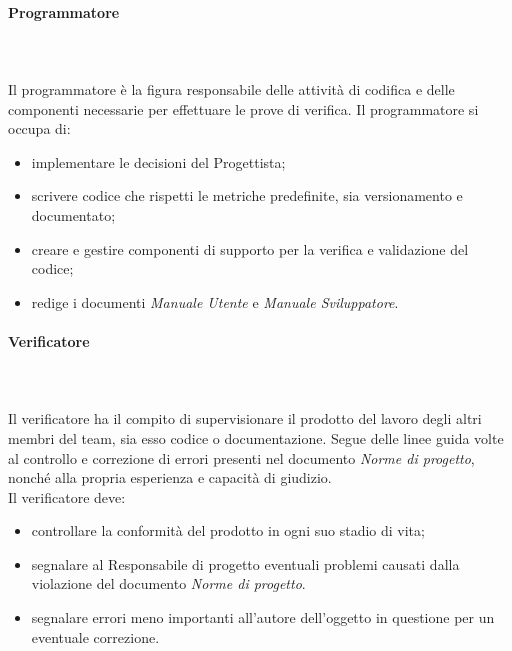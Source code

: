 			\paragraph{Programmatore} \mbox{}\\ \mbox{}\\
			Il programmatore è la figura responsabile delle attività di codifica e delle componenti necessarie per effettuare le prove di verifica.
			Il programmatore si occupa di:
			\begin{itemize}
				\item implementare le decisioni del Progettista;
				\item scrivere codice che rispetti le metriche predefinite, sia versionamento e documentato;
				\item creare e gestire componenti di supporto per la verifica e validazione del codice;
				\item redige i documenti \textit{Manuale Utente} e \textit{Manuale Sviluppatore}.
			\end{itemize}
			\paragraph{Verificatore} \mbox{}\\ \mbox{}\\
			Il verificatore ha il compito di supervisionare il prodotto del lavoro degli altri membri del team, sia esso codice o documentazione. Segue delle linee guida volte al controllo e correzione di errori presenti nel documento \textit{Norme di progetto}, nonché alla propria esperienza e capacità di giudizio.\\
			Il verificatore deve:
			\begin{itemize}
				\item controllare la conformità del prodotto in ogni suo stadio di vita;
				\item segnalare al Responsabile di progetto eventuali problemi causati dalla violazione del documento \textit{Norme di progetto}.
				\item segnalare errori meno importanti all'autore dell'oggetto in questione per un eventuale correzione.
							\end{itemize}
		
